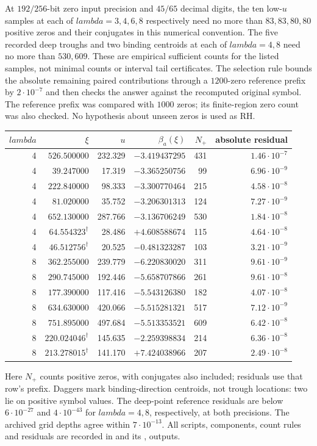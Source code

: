 \documentclass[11pt]{article}
\def\lambda{lambda}%
\theoremstyle{remark}
\begin{document}
At $192/256$-bit zero input precision and $45/65$ decimal digits, the
ten low-$u$ samples at each of $\lambda=3,4,6,8$ respectively need
no more than $83,83,80,80$ positive zeros and their conjugates in this
numerical convention. The five recorded deep troughs and two binding
centroids at each of $\lambda=4,8$ need no more than $530,609$.
These are empirical sufficient counts for the listed samples, not
minimal counts or interval tail certificates. The selection rule
bounds the absolute remaining paired contributions through a
$1200$-zero reference prefix by $2\cdot10^{-7}$ and then checks the
answer against the recomputed original symbol. The reference prefix
was compared with $1000$ zeros; its finite-region zero count was
also checked. No hypothesis about unseen zeros is used as RH.

\begin{center}
\small
\begin{tabular}{rrrrrr}
$\lambda$&$\xi$&$u$&$\beta_a(\xi)$&$N_+$&absolute residual\\\hline
4&$526.500000$&232.329&$-3.419437295$&431&$1.46\cdot10^{-7}$\\
4&$39.247000$&17.319&$-3.365250756$&99&$6.96\cdot10^{-9}$\\
4&$222.840000$&98.333&$-3.300770464$&215&$4.58\cdot10^{-8}$\\
4&$81.020000$&35.752&$-3.206301313$&124&$7.27\cdot10^{-9}$\\
4&$652.130000$&287.766&$-3.136706249$&530&$1.84\cdot10^{-8}$\\
4&$64.554323^{\dagger}$&28.486&$+4.608588674$&115&$4.64\cdot10^{-8}$\\
4&$46.512756^{\dagger}$&20.525&$-0.481323287$&103&$3.21\cdot10^{-9}$\\
8&$362.255000$&239.779&$-6.220830020$&311&$9.61\cdot10^{-9}$\\
8&$290.745000$&192.446&$-5.658707866$&261&$9.61\cdot10^{-8}$\\
8&$177.390000$&117.416&$-5.543126380$&182&$4.07\cdot10^{-8}$\\
8&$634.630000$&420.066&$-5.515281321$&517&$7.12\cdot10^{-9}$\\
8&$751.895000$&497.684&$-5.513353521$&609&$6.42\cdot10^{-8}$\\
8&$220.024046^{\dagger}$&145.635&$-2.259398834$&214&$6.36\cdot10^{-8}$\\
8&$213.278015^{\dagger}$&141.170&$+7.424038966$&207&$2.49\cdot10^{-8}$\\
\end{tabular}
\end{center}
Here $N_+$ counts positive zeros, with conjugates also included;
residuals use that row's prefix. Daggers mark binding-direction
centroids, not trough locations: two lie on positive symbol values.
The deep-point reference residuals are below $6\cdot10^{-27}$ and
$4\cdot10^{-43}$ for $\lambda=4,8$, respectively, at both precisions.
The archived grid depths agree within $7\cdot10^{-13}$.
All scripts, components, count rules and residuals are recorded in
 and its
,  outputs.
\end{document}
